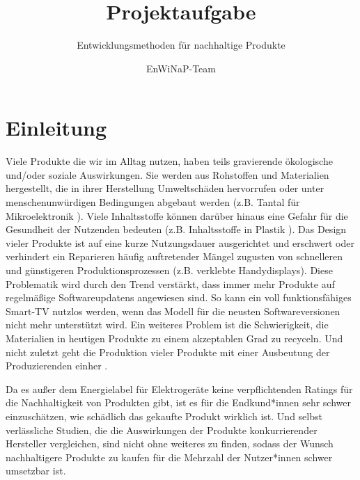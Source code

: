 \documentclass[headinclude=true]{scrartcl}
\begin{document}
\title{Projektaufgabe}
\subtitle{Entwicklungsmethoden für nachhaltige Produkte}
\author{EnWiNaP-Team}
\maketitle

\tableofcontents




\section{Einleitung}

Viele Produkte die wir im Alltag nutzen, haben teils gravierende ökologische und/oder soziale Auswirkungen. 
Sie werden aus Rohstoffen und Materialien hergestellt, die in ihrer Herstellung Umweltschäden hervorrufen oder unter menschenunwürdigen Bedingungen abgebaut werden (z.B. Tantal für Mikroelektronik \cite{Schippers.2020}). Viele Inhaltsstoffe können darüber hinaus eine Gefahr für die Gesundheit der Nutzenden bedeuten (z.B. Inhaltsstoffe in Plastik \cite{BUND.2021}).
Das Design vieler Produkte ist auf eine kurze Nutzungsdauer ausgerichtet und erschwert oder verhindert ein Reparieren häufig auftretender Mängel zugusten von schnelleren und günstigeren Produktionsprozessen (z.B. verklebte Handydisplays). Diese Problematik wird durch den Trend verstärkt, dass immer mehr Produkte auf regelmäßige Softwareupdatens angewiesen sind.
So kann ein voll funktionsfähiges Smart-TV nutzlos werden, wenn das Modell für die neusten Softwareversionen nicht mehr unterstützt wird.
Ein weiteres Problem ist die Schwierigkeit, die Materialien in heutigen Produkte zu einem akzeptablen Grad zu recyceln. Und nicht zuletzt geht die Produktion vieler Produkte mit einer Ausbeutung der Produzierenden einher \cite{Kollross.2017}.

Da es außer dem Energielabel für Elektrogeräte keine verpflichtenden Ratings für die Nachhaltigkeit von Produkten gibt, ist es für die Endkund*innen sehr schwer einzuschätzen, wie schädlich das gekaufte Produkt wirklich ist. Und selbst verlässliche Studien, die die Auswirkungen der Produkte konkurrierender Hersteller vergleichen, sind nicht ohne weiteres zu finden, sodass der Wunsch nachhaltigere Produkte zu kaufen für die Mehrzahl der Nutzer*innen schwer umsetzbar ist.
\end{document}
